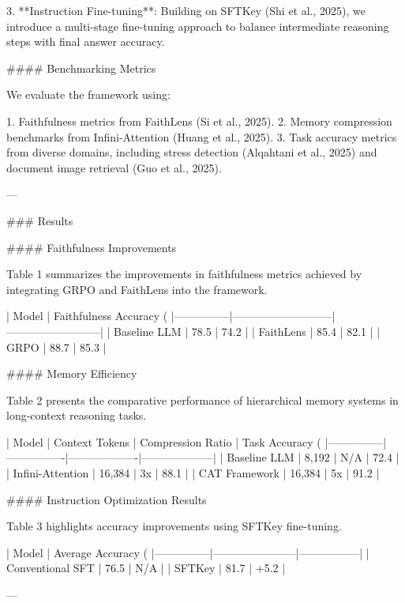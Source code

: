 3. **Instruction Fine-tuning**: Building on SFTKey (Shi et al., 2025), we introduce a multi-stage fine-tuning approach to balance intermediate reasoning steps with final answer accuracy.  

#### Benchmarking Metrics  

We evaluate the framework using:  

1. Faithfulness metrics from FaithLens (Si et al., 2025).  
2. Memory compression benchmarks from Infini-Attention (Huang et al., 2025).  
3. Task accuracy metrics from diverse domains, including stress detection (Alqahtani et al., 2025) and document image retrieval (Guo et al., 2025).  

---

### Results  

#### Faithfulness Improvements  

Table 1 summarizes the improvements in faithfulness metrics achieved by integrating GRPO and FaithLens into the framework.  

| Model         | Faithfulness Accuracy (%
|---------------|---------------------------|--------------------------|  
| Baseline LLM  | 78.5                      | 74.2                    |  
| FaithLens     | 85.4                      | 82.1                    |  
| GRPO          | 88.7                      | 85.3                    |  

#### Memory Efficiency  

Table 2 presents the comparative performance of hierarchical memory systems in long-context reasoning tasks.  

| Model         | Context Tokens | Compression Ratio | Task Accuracy (%
|---------------|----------------|-------------------|--------------------|  
| Baseline LLM  | 8,192          | N/A               | 72.4               |  
| Infini-Attention | 16,384      | 3x                | 88.1               |  
| CAT Framework | 16,384         | 5x                | 91.2               |  

#### Instruction Optimization Results  

Table 3 highlights accuracy improvements using SFTKey fine-tuning.  

| Model         | Average Accuracy (%
|---------------|-----------------------|-----------------|  
| Conventional SFT | 76.5              | N/A             |  
| SFTKey           | 81.7              | +5.2            |  

---

